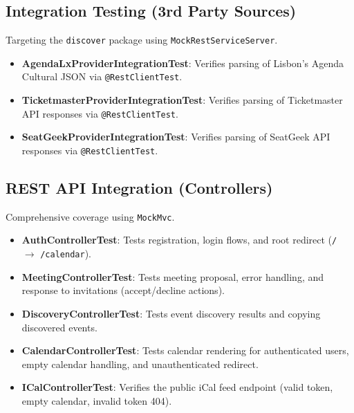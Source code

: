 \documentclass[11pt]{article}
\begin{document}
  \subsection{Integration Testing (3rd Party Sources)}
  Targeting the \texttt{discover} package using \texttt{MockRestServiceServer}.
  \begin{itemize}
    \item \textbf{AgendaLxProviderIntegrationTest}: Verifies parsing of Lisbon's Agenda Cultural JSON via \texttt{@RestClientTest}.
    \item \textbf{TicketmasterProviderIntegrationTest}: Verifies parsing of Ticketmaster API responses via \texttt{@RestClientTest}.
    \item \textbf{SeatGeekProviderIntegrationTest}: Verifies parsing of SeatGeek API responses via \texttt{@RestClientTest}.
  \end{itemize}

  \subsection{REST API Integration (Controllers)}
  Comprehensive coverage using \texttt{MockMvc}.
  \begin{itemize}
    \item \textbf{AuthControllerTest}: Tests registration, login flows, and root redirect (\texttt{/} $\rightarrow$ \texttt{/calendar}).
    \item \textbf{MeetingControllerTest}: Tests meeting proposal, error handling, and response to invitations (accept/decline actions).
    \item \textbf{DiscoveryControllerTest}: Tests event discovery results and copying discovered events.
    \item \textbf{CalendarControllerTest}: Tests calendar rendering for authenticated users, empty calendar handling, and unauthenticated redirect.
    \item \textbf{ICalControllerTest}: Verifies the public iCal feed endpoint (valid token, empty calendar, invalid token 404).
  \end{itemize}
\end{document}
